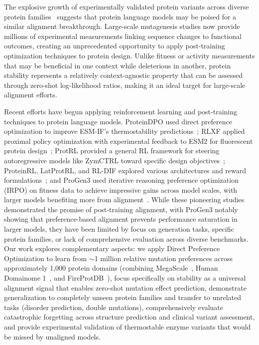\documentclass[]{fairmeta}
\begin{document}
The explosive growth of experimentally validated protein variants across diverse protein families~\citep{fowler2014deep,fowler2023atlas} suggests that protein language models may be poised for a similar alignment breakthrough. Large-scale mutagenesis studies now provide millions of experimental measurements linking sequence changes to functional outcomes, creating an unprecedented opportunity to apply post-training optimization techniques to protein design. Unlike fitness or activity measurements that may be beneficial in one context while deleterious in another, protein stability represents a relatively context-agnostic property that can be assessed through zero-shot log-likelihood ratios, making it an ideal target for large-scale alignment efforts.

Recent efforts have begun applying reinforcement learning and post-training techniques to protein language models. ProteinDPO used direct preference optimization to improve ESM-IF's thermostability predictions~\citep{widatalla2024aligning}; RLXF applied proximal policy optimization with experimental feedback to ESM2 for fluorescent protein design~\citep{blalock2025functional}; ProtRL provided a general RL framework for steering autoregressive models like ZymCTRL toward specific design objectives~\citep{stocco2024guiding}; ProteinRL, LatProtRL, and RL-DIF explored various architectures and reward formulations~\citep{sternke2023proteinrl,lee2024robust,ektefaie2024reinforcement}; and ProGen3 used iterative reasoning preference optimization (IRPO) on fitness data to achieve impressive gains across model scales, with larger models benefiting more from alignment~\citep{bhatnagar2025scaling,pang2024iterative}. While these pioneering studies demonstrated the promise of post-training alignment, with ProGen3 notably showing that preference-based alignment prevents performance saturation in larger models, they have been limited by focus on generation tasks, specific protein families, or lack of comprehensive evaluation across diverse benchmarks. Our work explores complementary aspects: we apply Direct Preference Optimization to learn from $\sim$1 million relative mutation preferences across approximately 1,000 protein domains (combining MegaScale~\citep{tsuboyama2023mega}, Human Domainome 1~\citep{beltran2025site}, and FireProtDB~\citep{stourac2021fireprotdb}), focus specifically on stability as a universal alignment signal that enables zero-shot mutation effect prediction, demonstrate generalization to completely unseen protein families and transfer to unrelated tasks (disorder prediction, double mutations), comprehensively evaluate catastrophic forgetting across structure prediction and clinical variant assessment, and provide experimental validation of thermostable enzyme variants that would be missed by unaligned models.
\end{document}
